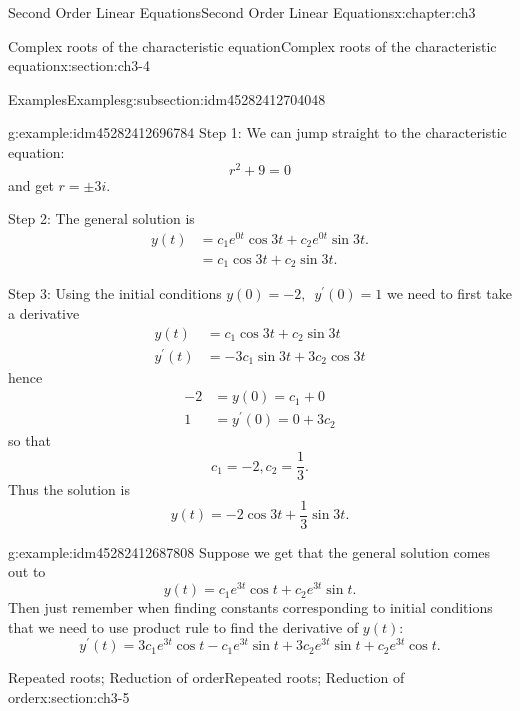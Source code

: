 \documentclass[oneside,10pt,]{book}
\numberwithin{equation}{section}
\numberwithin{equation}{section}
\newcommand{\amp}{&}
\begin{document}
\begin{chapterptx}{Second Order Linear Equations}{}{Second Order Linear Equations}{}{}{x:chapter:ch3}
\begin{sectionptx}{Complex roots of the characteristic equation}{}{Complex roots of the characteristic equation}{}{}{x:section:ch3-4}
\begin{subsectionptx}{Examples}{}{Examples}{}{}{g:subsection:idm45282412704048}
\begin{example}{}{g:example:idm45282412696784}
Step 1: We can jump straight to the characteristic equation:%
\begin{equation*}
r^{2}+9=0
\end{equation*}
and get \(r=\pm3i\).%
\par
Step 2: The general solution is%
\begin{align*}
y(t) \amp =c_{1}e^{0t}\cos3t+c_{2}e^{0t}\sin3t.\\
\amp =c_{1}\cos3t+c_{2}\sin3t.
\end{align*}
%
\par
Step 3: Using the initial conditions \(y(0)=-2,\,\,\,y^{\prime}(0)=1\) we need to first take a derivative%
\begin{align*}
y(t) \amp =c_{1}\cos3t+c_{2}\sin3t\\
y^{\prime}(t) \amp =-3c_{1}\sin3t+3c_{2}\cos3t
\end{align*}
hence%
\begin{align*}
-2 \amp =y(0)=c_{1}+0\\
1 \amp =y^{\prime}(0)=0+3c_{2}
\end{align*}
so that%
\begin{equation*}
c_{1}=-2,c_{2}=\frac{1}{3}.
\end{equation*}
Thus the solution is%
\begin{equation*}
y(t)=-2\cos3t+\frac{1}{3}\sin3t.
\end{equation*}
%
\end{example}
\begin{example}{}{g:example:idm45282412687808}%
Suppose we get that the general solution comes out to%
\begin{equation*}
y(t)=c_{1}e^{3t}\cos t+c_{2}e^{3t}\sin t.
\end{equation*}
Then just remember when finding constants corresponding to initial conditions that we need to use product rule to find the derivative of \(y(t)\):%
\begin{equation*}
y^{\prime}(t)=3c_{1}e^{3t}\cos t-c_{1}e^{3t}\sin t+3c_{2}e^{3t}\sin t+c_{2}e^{3t}\cos t.
\end{equation*}
%
\end{example}
\end{subsectionptx}
\end{sectionptx}
%
%
\typeout{************************************************}
\typeout{************************************************}
%
\begin{sectionptx}{Repeated roots; Reduction of order}{}{Repeated roots; Reduction of order}{}{}{x:section:ch3-5}

\end{sectionptx}
\end{chapterptx}
\end{document}

